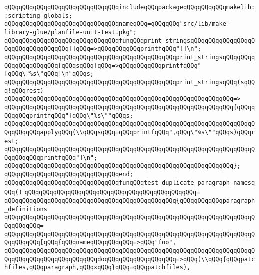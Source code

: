 \verb|qQQqqQQqqQQqqQQqqQQqqQQqqQQqqQQqincludeqQQqpackageqQQqqQQqqQQqmakelib::scripting_globals;|\newline
\newline
\verb|qQQqqQQqqQQqqQQqqQQqqQQqqQQqqQQqnameqQQq=qQQqqQQq"src/lib/make-library-glue/planfile-unit-test.pkg";|\newline
\newline
\newline
\verb|qQQqqQQqqQQqqQQqqQQqqQQqqQQqqQQqfunqQQqprint_stringsqQQqqQQqqQQqqQQqqQQqqQQqqQQqqQQqqQQq[]qQQq=>qQQqqQQqqQQqprintfqQQq"[]\n";|\newline
\verb|qQQqqQQqqQQqqQQqqQQqqQQqqQQqqQQqqQQqqQQqqQQqqQQqprint_stringsqQQqqQQqqQQqqQQqqQQqqQQq[qQQqsqQQq]qQQq=>qQQqqQQqqQQqprintfqQQq"[qQQq\"%s\"qQQq]\n"qQQqs;|\newline
\verb|qQQqqQQqqQQqqQQqqQQqqQQqqQQqqQQqqQQqqQQqqQQqqQQqprint_stringsqQQq(sqQQq!qQQqrest)|\newline
\verb|qQQqqQQqqQQqqQQqqQQqqQQqqQQqqQQqqQQqqQQqqQQqqQQqqQQqqQQqqQQqqQQq=>|\newline
\verb|qQQqqQQqqQQqqQQqqQQqqQQqqQQqqQQqqQQqqQQqqQQqqQQqqQQqqQQqqQQqqQQq{qQQqqQQqqQQqprintfqQQq"[qQQq\"%s\""qQQqs;|\newline
\verb|qQQqqQQqqQQqqQQqqQQqqQQqqQQqqQQqqQQqqQQqqQQqqQQqqQQqqQQqqQQqqQQqqQQqqQQqqQQqqQQqapplyqQQq(\\qQQqsqQQq=qQQqprintfqQQq",qQQq\"%s\""qQQqs)qQQqrest;|\newline
\verb|qQQqqQQqqQQqqQQqqQQqqQQqqQQqqQQqqQQqqQQqqQQqqQQqqQQqqQQqqQQqqQQqqQQqqQQqqQQqqQQqprintfqQQq"]\n";|\newline
\verb|qQQqqQQqqQQqqQQqqQQqqQQqqQQqqQQqqQQqqQQqqQQqqQQqqQQqqQQqqQQqqQQq};|\newline
\verb|qQQqqQQqqQQqqQQqqQQqqQQqqQQqqQQqend;|\newline
\newline
\verb|qQQqqQQqqQQqqQQqqQQqqQQqqQQqqQQqfunqQQqtest_duplicate_paragraph_namesqQQq()|\newline
\verb|qQQqqQQqqQQqqQQqqQQqqQQqqQQqqQQqqQQqqQQqqQQqqQQq=|\newline
\verb|qQQqqQQqqQQqqQQqqQQqqQQqqQQqqQQqqQQqqQQqqQQqqQQq{qQQqqQQqqQQqparagraph_definitions|\newline
\verb|qQQqqQQqqQQqqQQqqQQqqQQqqQQqqQQqqQQqqQQqqQQqqQQqqQQqqQQqqQQqqQQqqQQqqQQqqQQqqQQq=|\newline
\verb|qQQqqQQqqQQqqQQqqQQqqQQqqQQqqQQqqQQqqQQqqQQqqQQqqQQqqQQqqQQqqQQqqQQqqQQqqQQqqQQq[qQQq{qQQqnameqQQqqQQqqQQq=>qQQq"foo",|\newline
\verb|qQQqqQQqqQQqqQQqqQQqqQQqqQQqqQQqqQQqqQQqqQQqqQQqqQQqqQQqqQQqqQQqqQQqqQQqqQQqqQQqqQQqqQQqqQQqqQQqdoqQQqqQQqqQQqqQQqqQQq=>qQQq(\\qQQq{qQQqpatchfiles,qQQqparagraph,qQQqxqQQq}qQQq=qQQqpatchfiles),|\newline
